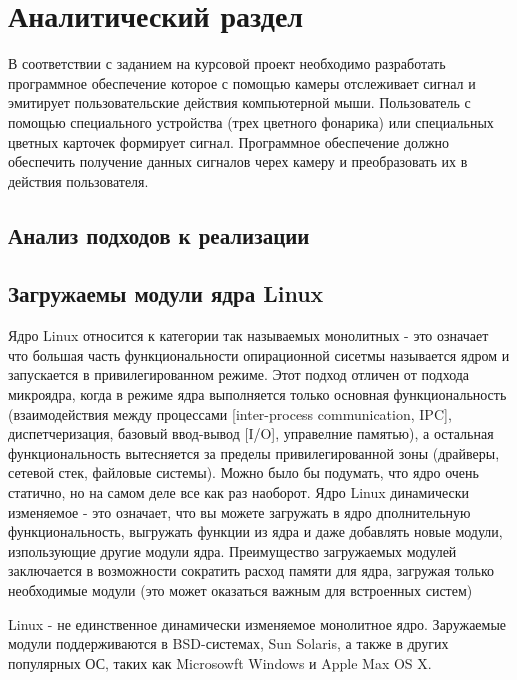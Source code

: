 \section{Аналитический раздел}
В соответствии с заданием на курсовой проект необходимо разработать программное обеспечение которое с помощью камеры отслеживает сигнал и эмитирует пользовательские действия компьютерной мыши. Пользователь с помощью специального устройства (трех цветного фонарика) или специальных цветных карточек формирует сигнал. Программное обеспечение должно обеспечить получение данных сигналов черех камеру и преобразовать их в действия пользователя.

\subsection{Анализ подходов к реализации}

\subsection{Загружаемы модули ядра Linux}
Ядро Linux относится к категории так называемых монолитных - это означает что большая часть функциональности опирационной сисетмы называется ядром и запускается в привилегированном режиме.
Этот подход отличен от подхода микроядра, когда в режиме ядра выполняется только основная функциональность (взаимодействия между процессами [inter-process communication, IPC], диспетчеризация, базовый ввод-вывод [I/O], управелние памятью), а остальная функциональность вытесняется за пределы привилегированной зоны (драйверы, сетевой стек, файловые системы). 
Можно было бы подумать, что ядро очень статично, но на самом деле все как раз наоборот. 
Ядро Linux динамически изменяемое - это означает, что вы можете загружать в ядро дполнительную функциональность, выгружать функции из ядра и даже добавлять новые модули, изпользующие другие модули ядра.
Преимущество загружаемых модулей заключается в возможности сократить расход памяти для ядра, загружая только необходимые модули (это может оказаться важным для встроенных систем) \cite{1}

Linux - не единственное динамически изменяемое монолитное ядро. Заружаемые модули поддерживаются в BSD-системах, Sun Solaris, а также в других популярных ОС, таких как Microsowft Windows и Apple Max OS X.

